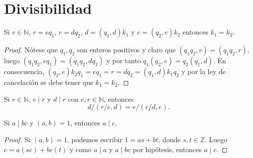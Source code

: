 \titleformat{\section}{\normalfont\Large\bfseries\sffamily}{\thesection}{10pt}{\Large}
\titlespacing*{\section}{0pt}{20pt}{15pt}
\newpage
\appendix
\section{Divisibilidad}

\begin{proposition}
Si $r \in \mathbb{N}$, $r=e q_1$, $r= d q_2$, $d=(q_1,d)k_1$ y $e=(q_2,e) k_2$ entonces $k_1=k_2$.
\end{proposition}
\begin{proof}
Nótese que $q_1,q_2$ son enteros positivos y claro que $(q_1 q_2, r) = (q_1 q_2, r)$, luego $(q_1 q_2,e q_1)=(q_1 q_2,d q_2)$ y por tanto $q_1 (q_2,e)=q_2 (q_1,d)$. En consecuencia, $(q_2,e)k_2 q_1 = e q_1 = r = d q_2 = (q_1,d)k_1 q_2$ y por la ley de cancelación se debe tener que $k_1 = k_2$.
\end{proof}

\begin{corollary}\label{cor:mcd1}
Si $r \in \mathbb{N}$, $e \mid r$ y $d \mid r$ con $e,r \in \mathbb{N}$, entonces
\begin{equation*}
    d/\left( r/e,d \right) = e/\left( r/d,e \right).
\end{equation*}
\end{corollary}

\begin{theorem}
Si $a \mid bc$ y $(a,b)=1$, entonces $a \mid c$.
\end{theorem}
\begin{proof}
Si $(a,b)=1$, podemos escribir $1=a s+b t$, donde $s,t\in \mathbb{Z}$. Luego $c=a(s c)+b c(t)$ y como $a \mid a$ y $a \mid bc$ por hipótesis, entonces $a \mid c$.
\end{proof}
